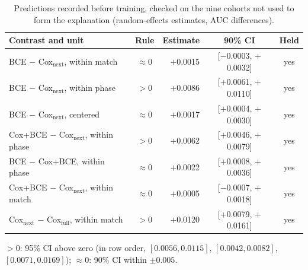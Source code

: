\begin{table}[t]
\centering\footnotesize
\caption{Predictions recorded before training, checked on the nine cohorts not used to form the explanation (random-effects estimates, AUC differences).}
\label{tab:predictions}
\setlength{\tabcolsep}{2.5pt}
\begin{tabular}{lcrcc}
\toprule
Contrast and unit & Rule & Estimate & 90\% CI & Held \\
\midrule
BCE $-$ Cox$_{\mathrm{next}}$, within match & $\approx0$ & $+$0.0015 & [$-$0.0003, $+$0.0032] & yes \\
BCE $-$ Cox$_{\mathrm{next}}$, within phase & $>0$ & $+$0.0086 & [$+$0.0061, $+$0.0110] & yes \\
BCE $-$ Cox$_{\mathrm{next}}$, centered & $\approx0$ & $+$0.0017 & [$+$0.0004, $+$0.0030] & yes \\
Cox+BCE $-$ Cox$_{\mathrm{next}}$, within phase & $>0$ & $+$0.0062 & [$+$0.0046, $+$0.0079] & yes \\
BCE $-$ Cox+BCE, within phase & $\approx0$ & $+$0.0022 & [$+$0.0008, $+$0.0036] & yes \\
Cox+BCE $-$ Cox$_{\mathrm{next}}$, within match & $\approx0$ & $+$0.0005 & [$-$0.0007, $+$0.0018] & yes \\
Cox$_{\mathrm{next}}$ $-$ Cox$_{\mathrm{full}}$, within match & $>0$ & $+$0.0120 & [$+$0.0079, $+$0.0161] & yes \\
\bottomrule
\end{tabular}
\smallskip
\parbox{\columnwidth}{\scriptsize $>0$: 95\% CI above zero (in row order, $[0.0056, 0.0115]$, $[0.0042, 0.0082]$, $[0.0071, 0.0169]$); $\approx0$: 90\% CI within $\pm0.005$.}
\end{table}
